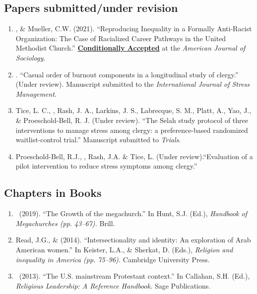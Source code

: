 \subsection*{Papers submitted/under revision}
\begin{enumerate} 
	
\item \Eagle, \& Mueller, C.W. (2021). ``Reproducing Inequality in a Formally Anti-Racist Organization: The Case of Racialized Career Pathways in the United Methodist Church.'' \textbf{\underline{Conditionally Accepted}} at the \textit{American Journal of Sociology}.	
	
\item \Eagle. ``Casual order of burnout components in a longitudinal study of clergy.'' (Under review). Manuscript submitted to the \textit{International Journal of Stress Management}.

\item Tice, L. C., \Eagle, Rash, J. A., Larkins, J. S., Labrecque, S. M., Platt, A., Yao, J., \& Proeschold-Bell, R. J. (Under review). ``The Selah study protocol of three interventions to manage stress among clergy: a preference-based randomized waitlist-control trial.'' Manuscript submitted to \emph{Trials}.

\item Proeschold-Bell, R.J., \Eagle, Rash, J.A. \& Tice, L. (Under review).``Evaluation of a pilot intervention to reduce stress symptoms among clergy.''
\end{enumerate}

\subsection*{Chapters in Books}
\begin{enumerate} 
\item \Eagle\ (2019). ``The Growth of the megachurch.'' In Hunt, S.J. (Ed.), \emph{Handbook of Megachurches (pp. 43--67).} Brill.

\item Read, J.G., \& \Eagle \hspace{.01em}  (2014). ``Intersectionality and identity: An exploration of Arab American women.'' In Keister, L.A., \& Sherkat, D. (Eds.), \emph{Religion and inequality in America (pp. 75--96).} Cambridge University Press.

\item \Eagle\ (2013). ``The U.S. mainstream Protestant context.'' In Callahan, S.H. (Ed.), \emph{Religious Leadership: A Reference Handbook.} Sage Publications.
\end{enumerate}

